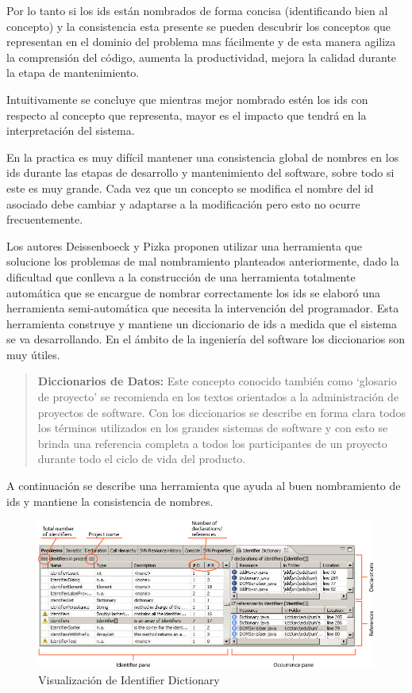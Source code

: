 \documentclass[12pt]{report}
\begin{document}
Por lo tanto si los ids están nombrados de forma concisa (identificando bien al concepto) y la consistencia esta presente se pueden descubrir los conceptos que representan en el dominio del problema mas fácilmente y de esta manera agiliza la comprensión del código, aumenta la productividad, mejora la calidad durante la etapa de mantenimiento\cite{DFPM05,DLHD06}.%

Intuitivamente se concluye 	que mientras mejor nombrado estén los ids con respecto al concepto que representa, mayor es el impacto que tendrá en la interpretación del sistema\cite{DFPM05,DLHD06}.

En la practica es muy difícil mantener una consistencia global de nombres en los ids durante las etapas de desarrollo y mantenimiento del software, sobre todo si este es muy grande. Cada vez que un concepto se modifica el nombre del id asociado debe cambiar y adaptarse a la modificación pero esto no ocurre frecuentemente.

Los autores Deissenboeck y Pizka\cite{DFPM05} proponen utilizar una herramienta que solucione los problemas de mal nombramiento planteados anteriormente, dado la dificultad que conlleva a la construcción de una herramienta totalmente automática que se encargue de nombrar correctamente los ids se elaboró una herramienta semi-automática que necesita la intervención del programador. Esta herramienta construye y mantiene un diccionario de ids a medida que el sistema se va desarrollando. En el ámbito de la ingeniería del software los diccionarios son muy útiles.

\begin{verse}
\textbf{Diccionarios de Datos:} Este concepto conocido también como `glosario de proyecto' se recomienda en los textos orientados a la administración de proyectos de software. Con los diccionarios se describe en forma clara todos los términos utilizados en los grandes sistemas de software y con esto se brinda una referencia completa a todos los participantes de un proyecto durante todo el ciclo de vida del producto.
\end{verse}

A continuación se describe una herramienta que ayuda al buen nombramiento de ids y mantiene la consistencia de nombres.

\begin{figure}[h] %
\centering
\includegraphics[scale= 0.50]{./idd_2.png}
\caption{Visualización de Identifier Dictionary}
\label{captura3}
\end{figure}
\pagebreak
\end{document}
